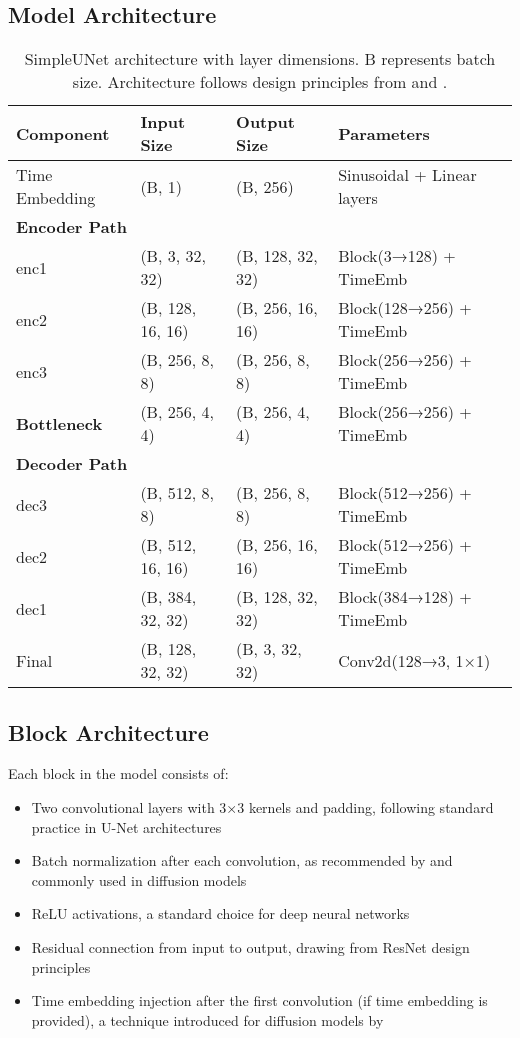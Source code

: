 \documentclass{article}
\begin{document}
\subsection{Model Architecture}

\begin{table}[h]
\centering
\begin{tabular}{llll}
\toprule
\textbf{Component} & \textbf{Input Size} & \textbf{Output Size} & \textbf{Parameters} \\
\midrule
Time Embedding & (B, 1) & (B, 256) & Sinusoidal + Linear layers \\
\midrule
\multicolumn{4}{l}{\textbf{Encoder Path}} \\
enc1 & (B, 3, 32, 32) & (B, 128, 32, 32) & Block(3→128) + TimeEmb \\
enc2 & (B, 128, 16, 16) & (B, 256, 16, 16) & Block(128→256) + TimeEmb \\
enc3 & (B, 256, 8, 8) & (B, 256, 8, 8) & Block(256→256) + TimeEmb \\
\midrule
\textbf{Bottleneck} & (B, 256, 4, 4) & (B, 256, 4, 4) & Block(256→256) + TimeEmb \\
\midrule
\multicolumn{4}{l}{\textbf{Decoder Path}} \\
dec3 & (B, 512, 8, 8) & (B, 256, 8, 8) & Block(512→256) + TimeEmb \\
dec2 & (B, 512, 16, 16) & (B, 256, 16, 16) & Block(512→256) + TimeEmb \\
dec1 & (B, 384, 32, 32) & (B, 128, 32, 32) & Block(384→128) + TimeEmb \\
\midrule
Final & (B, 128, 32, 32) & (B, 3, 32, 32) & Conv2d(128→3, 1×1) \\
\bottomrule
\end{tabular}
\caption{SimpleUNet architecture with layer dimensions. B represents batch size. Architecture follows design principles from \citet{ho2020denoising} and \citet{nichol2021improved}.}
\end{table}

\subsection{Block Architecture}
Each block in the model consists of:
\begin{itemize}
  \item Two convolutional layers with 3×3 kernels and padding, following standard practice in U-Net architectures \citep{ronneberger2015unet}
  \item Batch normalization after each convolution, as recommended by \citet{ioffe2015batch} and commonly used in diffusion models \citep{ho2020denoising}
  \item ReLU activations, a standard choice for deep neural networks \citep{nair2010rectified}
  \item Residual connection from input to output, drawing from ResNet design principles \citep{he2016deep}
  \item Time embedding injection after the first convolution (if time embedding is provided), a technique introduced for diffusion models by \citet{ho2020denoising}
\end{itemize}
\end{document}
